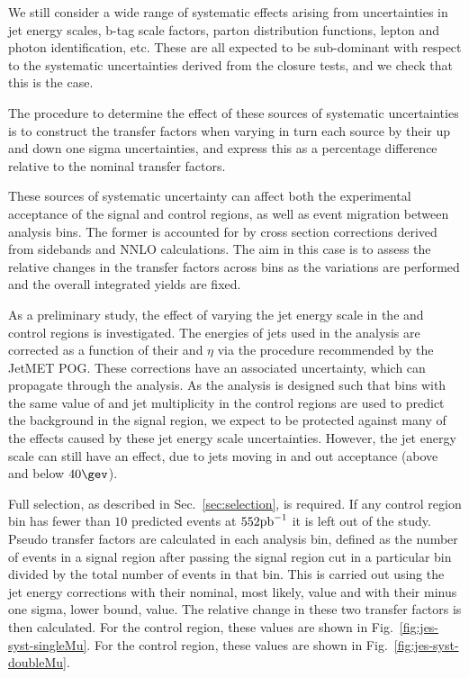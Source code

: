 We still consider a wide range of  systematic effects arising from 
uncertainties in jet energy scales, b-tag scale factors, parton distribution 
functions, lepton and photon identification, etc. These are all expected 
to be sub-dominant with respect to the systematic uncertainties derived 
from the closure tests, and we check that this is the case.

The procedure to determine the effect of these sources of systematic
uncertainties is to construct the transfer factors when varying in turn each
source by their up and down one sigma uncertainties, and express this as a
percentage difference relative to the nominal transfer factors. 

These sources of systematic uncertainty can affect both the
experimental acceptance of the signal and control regions, as well as event
migration between analysis bins. The former is accounted for by cross section
corrections derived from sidebands and NNLO calculations. The aim in this case
is to assess the relative changes in the transfer factors across bins
as the variations are performed and the overall integrated yields are fixed.


As a preliminary study, the effect of varying the jet
energy scale in the \mj and \mmj control regions is investigated.
The energies of jets used in the analysis are corrected as a function of
their \pt and $\eta$ via the procedure recommended by
the JetMET POG. These corrections have an associated uncertainty,
which can propagate through the analysis. 
As the analysis is designed such that bins
with the same value of \scalht and jet multiplicity in the control
regions are used to predict the background in the signal region, we
expect to be protected against many of the effects caused by these jet
energy scale uncertainties. However, the jet energy scale can still
have an effect, due to jets moving in and
out acceptance (above and below $40\gev$).

Full selection, as described in Sec.~\ref{sec:selection}, is required.
If any control region bin has fewer
than $10$ predicted events at $552\text{pb}^{-1}$ it is left out of the study.
Pseudo transfer factors are calculated in each analysis bin, defined
as the number of events in a signal region after passing the signal
region \alphat cut in a particular bin divided by the total number of
events in that bin. This is carried out using the jet energy
corrections with their nominal, most likely, value and with their
minus one sigma, lower bound, value. The relative change in these two
transfer factors is then calculated. For the \mj control region, these
values are shown in Fig.~\ref{fig:jes-syst-singleMu}. For the \mmj
control region, these values are shown in
Fig.~\ref{fig:jes-syst-doubleMu}. 

